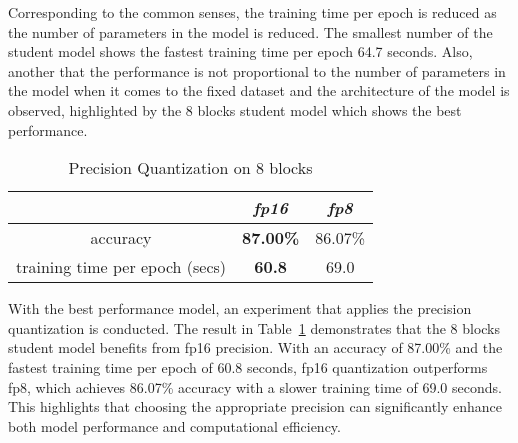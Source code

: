 Corresponding to the common senses,
the training time per epoch is reduced as the number of parameters in the model is reduced.
The smallest number of the student model shows
the fastest training time per epoch 64.7 seconds.
Also, another that the performance is not proportional to the number of parameters in the model
when it comes to the fixed dataset and the architecture of the model is observed,
highlighted by the 8 blocks student model which shows the best performance.

\begin{table}[ht]
\centering
\caption{Precision Quantization on 8 blocks}
\label{tab:quantization_8_blocks}
\begin{tabular}{|c|c|c|}
\hline
                        & \textit{fp16}    & \textit{fp8}    \\ \hline
accuracy              & \textbf{87.00\%} & 86.07\% \\ \hline
training time per epoch (secs) & \textbf{60.8}    & 69.0   \\ \hline
\end{tabular}
\end{table}

With the best performance model,
an experiment that applies the precision quantization is conducted.
The result in Table~\ref{tab:quantization_8_blocks} demonstrates that
the 8 blocks student model benefits from fp16 precision.
With an accuracy of 87.00\% and the fastest training time per epoch of 60.8 seconds,
fp16 quantization outperforms fp8,
which achieves 86.07\% accuracy with a slower training time of 69.0 seconds.
This highlights that choosing the appropriate precision can significantly enhance
both model performance and computational efficiency.
